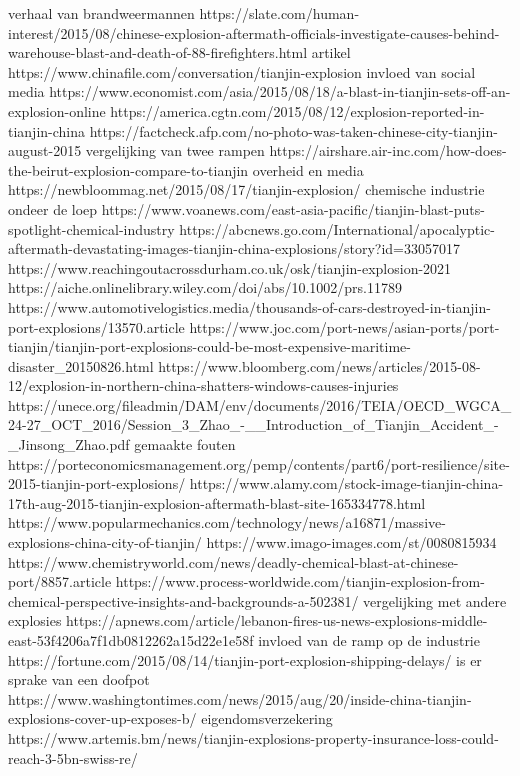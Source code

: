 verhaal van brandweermannen
https://slate.com/human-interest/2015/08/chinese-explosion-aftermath-officials-investigate-causes-behind-warehouse-blast-and-death-of-88-firefighters.html
artikel
https://www.chinafile.com/conversation/tianjin-explosion
invloed van social media
https://www.economist.com/asia/2015/08/18/a-blast-in-tianjin-sets-off-an-explosion-online
https://america.cgtn.com/2015/08/12/explosion-reported-in-tianjin-china
https://factcheck.afp.com/no-photo-was-taken-chinese-city-tianjin-august-2015
vergelijking van twee rampen
https://airshare.air-inc.com/how-does-the-beirut-explosion-compare-to-tianjin
overheid en media
https://newbloommag.net/2015/08/17/tianjin-explosion/
chemische industrie ondeer de loep
https://www.voanews.com/east-asia-pacific/tianjin-blast-puts-spotlight-chemical-industry
https://abcnews.go.com/International/apocalyptic-aftermath-devastating-images-tianjin-china-explosions/story?id=33057017
https://www.reachingoutacrossdurham.co.uk/osk/tianjin-explosion-2021
https://aiche.onlinelibrary.wiley.com/doi/abs/10.1002/prs.11789
https://www.automotivelogistics.media/thousands-of-cars-destroyed-in-tianjin-port-explosions/13570.article
https://www.joc.com/port-news/asian-ports/port-tianjin/tianjin-port-explosions-could-be-most-expensive-maritime-disaster_20150826.html
https://www.bloomberg.com/news/articles/2015-08-12/explosion-in-northern-china-shatters-windows-causes-injuries
https://unece.org/fileadmin/DAM/env/documents/2016/TEIA/OECD_WGCA_24-27_OCT_2016/Session_3_Zhao_-__Introduction_of_Tianjin_Accident_-_Jinsong_Zhao.pdf
gemaakte fouten
https://porteconomicsmanagement.org/pemp/contents/part6/port-resilience/site-2015-tianjin-port-explosions/
https://www.alamy.com/stock-image-tianjin-china-17th-aug-2015-tianjin-explosion-aftermath-blast-site-165334778.html
https://www.popularmechanics.com/technology/news/a16871/massive-explosions-china-city-of-tianjin/
https://www.imago-images.com/st/0080815934
https://www.chemistryworld.com/news/deadly-chemical-blast-at-chinese-port/8857.article
https://www.process-worldwide.com/tianjin-explosion-from-chemical-perspective-insights-and-backgrounds-a-502381/
vergelijking met andere explosies
https://apnews.com/article/lebanon-fires-us-news-explosions-middle-east-53f4206a7f1db0812262a15d22e1e58f
invloed van de ramp op de industrie
https://fortune.com/2015/08/14/tianjin-port-explosion-shipping-delays/
is er sprake van een doofpot
https://www.washingtontimes.com/news/2015/aug/20/inside-china-tianjin-explosions-cover-up-exposes-b/
eigendomsverzekering
https://www.artemis.bm/news/tianjin-explosions-property-insurance-loss-could-reach-3-5bn-swiss-re/
